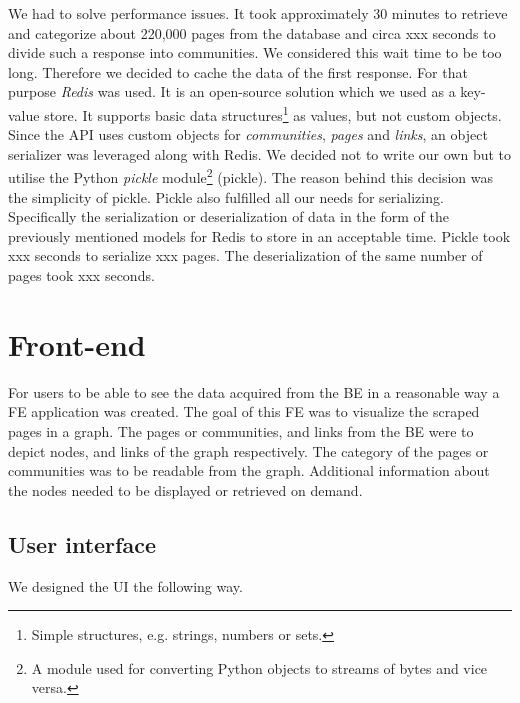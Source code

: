 We had to solve performance issues. It took approximately 30 minutes to retrieve and categorize about 220,000 pages from the database and circa xxx seconds to divide such a response into communities. We considered this wait time to be too long. Therefore we decided to cache the data of the first response. For that purpose \textit{Redis} \cite{redis} was used. It is an open-source solution which we used as a key-value store. It supports basic data structures\footnote{Simple structures, e.g. strings, numbers or sets.} as values, but not custom objects. Since the API uses custom objects for \textit{communities}, \textit{pages} and \textit{links}, an object serializer was leveraged along with Redis. We decided not to write our own but to utilise the Python \textit{pickle} module\footnote{A module used for converting Python objects to streams of bytes and vice versa.} \cite{pickle} (pickle). The reason behind this decision was the simplicity of pickle. Pickle also fulfilled all our needs for serializing. Specifically the serialization or deserialization of data in the form of the previously mentioned models for Redis to store in an acceptable time. Pickle took xxx seconds to serialize xxx pages. The deserialization of the same number of pages took xxx seconds.

\section{Front-end}
For users to be able to see the data acquired from the BE in a reasonable way a FE application was created. The goal of this FE was to visualize the scraped pages in a graph. The pages or communities, and links from the BE were to depict nodes, and links of the graph respectively. The category of the pages or communities was to be readable from the graph. Additional information about the nodes needed to be displayed or retrieved on demand.

\subsection{User interface}
We designed the UI the following way. 

